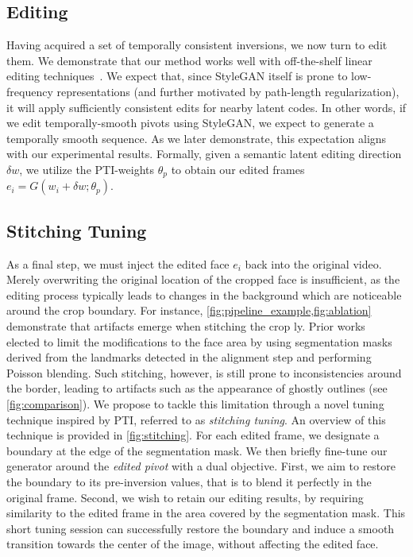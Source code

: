 \subsection{Editing}
Having acquired a set of temporally consistent inversions, we now turn to edit them. We demonstrate that our method works well with off-the-shelf linear editing techniques~\cite{shen2020interpreting,patashnik2021styleclip}.
We expect that, since StyleGAN itself is prone to low-frequency representations (and further motivated by path-length regularization), it will apply sufficiently consistent edits for nearby latent codes. In other words, if we edit temporally-smooth pivots using StyleGAN, we expect to generate a temporally smooth sequence. As we later demonstrate, this expectation aligns with our experimental results. Formally, given a semantic latent editing direction $\delta w$, we utilize the PTI-weights $\theta_p$ to obtain our edited frames $e_i = G(w_i+\delta w; \theta_p)$. 

\subsection{Stitching Tuning}



As a final step, we must inject the edited face $e_i$ back into the original video. Merely overwriting the original location of the cropped face is insufficient, as the editing process typically leads to changes in the background which are noticeable around the crop boundary. For instance, \cref{fig:pipeline_example,fig:ablation} demonstrate that artifacts emerge when stitching the crop {\naive}ly. Prior works~\cite{yao2021latent} elected to limit the modifications to the face area by using segmentation masks derived from the landmarks detected in the alignment step and performing Poisson blending. Such stitching, however, is still prone to inconsistencies around the border, leading to artifacts such as the appearance of ghostly outlines (see \cref{fig:comparison}). We propose to tackle this limitation through a novel tuning technique inspired by PTI, referred to as \textit{stitching tuning}. An overview of this technique is provided in \cref{fig:stitching}. For each edited frame, we designate a boundary at the edge of the segmentation mask. We then briefly fine-tune our generator around the \textit{edited pivot} with a dual objective. First, we aim to restore the boundary to its pre-inversion values, that is to blend it perfectly in the original frame. Second, we wish to retain our editing results, by requiring similarity to the edited frame in the area covered by the segmentation mask. This short tuning session can successfully restore the boundary and induce a smooth transition towards the center of the image, without affecting the edited face. 

